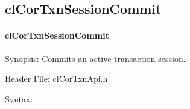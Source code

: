\begin{flushleft}
\subsection{clCorTxnSessionCommit}
\hypertarget{pagecor140}{}\paragraph{cl\-Cor\-Txn\-Session\-Commit}\label{pagecor140}
\begin{Desc}
\item[Synopsis:]Commits an active transaction session.\end{Desc}
\begin{Desc}
\item[Header File:]clCorTxnApi.h\end{Desc}
\begin{Desc}
\item[Syntax:]


\end{Desc}
\end{flushleft}
